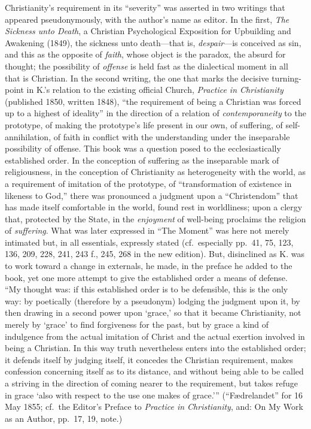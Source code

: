\documentclass[12pt,a4paper]{article}
\begin{document}
Christianity's requirement in its ``severity'' was asserted in two writings that
appeared pseudonymously, with the author's name as editor. In the first, \emph{The
Sickness unto Death}, a Christian Psychological Exposition for Upbuilding and
Awakening (1849), the sickness unto death---that is, \emph{despair}---is conceived as
sin, and this as the opposite of \emph{faith}, whose object is the paradox, the absurd
for thought; the possibility of \emph{offense} is held fast as the dialectical moment in
all that is Christian. In the second writing, the one that marks the decisive
turning-point in K.'s relation to the existing official Church, \emph{Practice in
Christianity} (published 1850, written 1848), ``the requirement of being a
Christian was forced up to a highest of ideality'' in the direction of a relation
of \emph{contemporaneity} to the prototype, of making the prototype's life present in our
own, of suffering, of self-annihilation, of faith in conflict with the
understanding under the inseparable possibility of offense. This book was a
question posed to the ecclesiastically established order. In the conception of
suffering as the inseparable mark of religiousness, in the conception of
Christianity as heterogeneity with the world, as a requirement of imitation of the
prototype, of ``transformation of existence in likeness to God,'' there was
pronounced a judgment upon a ``Christendom'' that has made itself comfortable in
the world, found rest in worldliness; upon a clergy that, protected by the State,
in the \emph{enjoyment} of well-being proclaims the religion of \emph{suffering}. What was later
expressed in ``The Moment'' was here not merely intimated but, in all essentials,
expressly stated (cf.\ especially pp.\ 41, 75, 123, 136, 209, 228, 241, 243 f.,
245, 268 in the new edition). But, disinclined as K. was to work toward a change in
externals, he made, in the preface he added to the book, yet one more attempt to
give the established order a means of defense. ``My thought was: if this
established order is to be defensible, this is the only way: by poetically
(therefore by a pseudonym) lodging the judgment upon it, by then drawing in a
second power upon `grace,' so that it became Christianity, not merely by `grace' to
find forgiveness for the past, but by grace a kind of indulgence from the actual
imitation of Christ and the actual exertion involved in being a Christian. In this
way truth nevertheless enters into the established order; it defends itself by
judging itself, it concedes the Christian requirement, makes confession concerning
itself as to its distance, and without being able to be called a striving in the
direction of coming nearer to the requirement, but takes refuge in grace `also
with respect to the use one makes of grace.''' (``Fædrelandet'' for 16 May 1855;
cf.\ the Editor's Preface to \emph{Practice in Christianity}, and: On My Work as an
Author, pp.\ 17, 19, note.)
\end{document}
